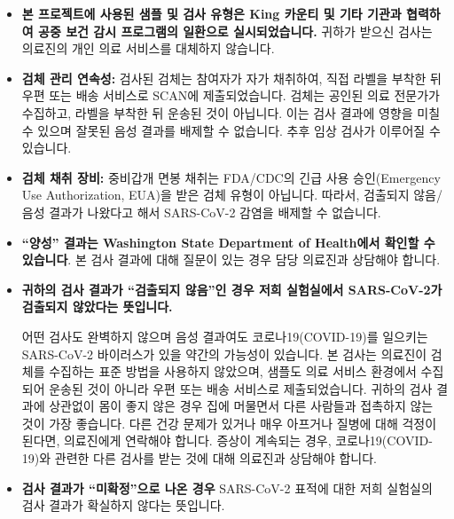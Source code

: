 \documentclass[10pt]{article}
\begin{document}
\begin{itemize}
\item

  \textbf{본 프로젝트에 사용된 샘플 및 검사 유형은 King 카운티 및 기타 기관과 협력하여 공중 보건
  감시 프로그램의 일환으로 실시되었습니다.} 귀하가 받으신 검사는 의료진의 개인 의료 서비스를
  대체하지 않습니다.

\item

  \textbf{검체 관리 연속성:} 검사된 검체는 참여자가 자가 채취하여, 직접 라벨을 부착한 뒤 우편
  또는 배송 서비스로 SCAN에 제출되었습니다. 검체는 공인된 의료 전문가가 수집하고, 라벨을 부착한
  뒤 운송된 것이 아닙니다. 이는 검사 결과에 영향을 미칠 수 있으며 잘못된 음성 결과를 배제할 수
  없습니다. 추후 임상 검사가 이루어질 수 있습니다.

\item

  \textbf{검체 채취 장비:} 중비갑개 면봉 채취는 FDA/CDC의 긴급 사용 승인(Emergency Use
  Authorization, EUA)을 받은 검체 유형이 아닙니다. 따라서, 검출되지 않음/음성 결과가 나왔다고
  해서 SARS-CoV-2 감염을 배제할 수 없습니다.

\item

  \textbf{``양성'' 결과는 Washington State Department of Health에서 확인할 수 있습니다}.
  본 검사 결과에 대해 질문이 있는 경우 담당 의료진과 상담해야 합니다.

\item{
  \textbf{귀하의 검사 결과가 ``검출되지 않음''인 경우 저희 실험실에서 SARS-CoV-2가 검출되지
  않았다는 뜻입니다.}

  어떤 검사도 완벽하지 않으며 음성 결과여도 코로나19(COVID-19)를 일으키는 SARS-CoV-2
  바이러스가 있을 약간의 가능성이 있습니다.  본 검사는 의료진이 검체를 수집하는 표준 방법을
  사용하지 않았으며, 샘플도 의료 서비스 환경에서 수집되어 운송된 것이 아니라 우편 또는 배송
  서비스로 제출되었습니다.  귀하의 검사 결과에 상관없이 몸이 좋지 않은 경우 집에 머물면서 다른
  사람들과 접촉하지 않는 것이 가장 좋습니다. 다른 건강 문제가 있거나 매우 아프거나 질병에 대해
  걱정이 된다면, 의료진에게 연락해야 합니다.  증상이 계속되는 경우, 코로나19(COVID-19)와 관련한
  다른 검사를 받는 것에 대해 의료진과 상담해야 합니다.
}

\item

  \textbf{검사 결과가 ``미확정''으로 나온 경우} SARS-CoV-2 표적에 대한 저희 실험실의 검사
  결과가 확실하지 않다는 뜻입니다.


\end{itemize}
\end{document}
